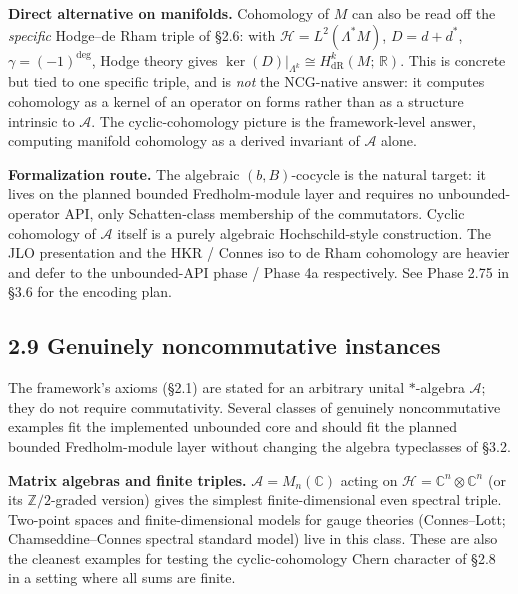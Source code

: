 \documentclass[
  11pt,
]{article}
\begin{document}
\textbf{Direct alternative on manifolds.} Cohomology of \(M\) can also
be read off the \emph{specific} Hodge--de Rham triple of §2.6: with
\(\mathcal{H}= L^2(\Lambda^* M)\), \(D = d + d^*\),
\(\gamma = (-1)^{\deg}\), Hodge theory gives
\(\ker(D)|_{\Lambda^k} \cong H^k_{\mathrm{dR}}(M;\,\mathbb{R})\). This
is concrete but tied to one specific triple, and is \emph{not} the
NCG-native answer: it computes cohomology as a kernel of an operator on
forms rather than as a structure intrinsic to \(\mathcal{A}\). The
cyclic-cohomology picture is the framework-level answer, computing
manifold cohomology as a derived invariant of \(\mathcal{A}\) alone.

\textbf{Formalization route.} The algebraic \((b, B)\)-cocycle is the
natural target: it lives on the planned bounded Fredholm-module layer
and requires no unbounded-operator API, only Schatten-class membership of
the commutators. Cyclic cohomology of \(\mathcal{A}\) itself is a purely
algebraic Hochschild-style construction. The JLO presentation and the
HKR / Connes iso to de Rham cohomology are heavier and defer to the
unbounded-API phase / Phase 4a respectively. See Phase 2.75 in §3.6 for
the encoding plan.

\subsection{2.9 Genuinely noncommutative
instances}\label{genuinely-noncommutative-instances}

The framework's axioms (§2.1) are stated for an arbitrary unital
\(*\)-algebra \(\mathcal{A}\); they do not require commutativity.
Several classes of genuinely noncommutative examples fit the implemented
unbounded core and should fit the planned bounded Fredholm-module layer
without changing the algebra typeclasses of §3.2.

\textbf{Matrix algebras and finite triples.}
\(\mathcal{A}= M_n(\mathbb{C})\) acting on
\(\mathcal{H}= \mathbb{C}^n \otimes \mathbb{C}^n\) (or its
\(\mathbb{Z}/2\)-graded version) gives the simplest finite-dimensional
even spectral triple. Two-point spaces and finite-dimensional models for
gauge theories (Connes--Lott; Chamseddine--Connes spectral standard
model) live in this class. These are also the cleanest examples for
testing the cyclic-cohomology Chern character of §2.8 in a setting where
all sums are finite.
\end{document}
